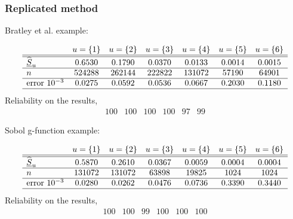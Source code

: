 \subsubsection{Replicated method}
Bratley et al. example:

\[
\begin{array}{lcccccc}
   & u=\{1\} & u=\{2\} & u=\{3\} & u=\{4\} & u=\{5\} & u=\{6\} \\ \hline \hline
 \widehat{\underline{S}}_u & 0.6530 & 0.1790 & 0.0370 & 0.0133 & 0.0014 & 0.0015 \\ \hline
 n & 524288 & 262144  &  222822 & 131072 & 57190 & 64901 \\ \hline
 \text{error } 10^{-3} & 0.0275 & 0.0592 & 0.0536 & 0.0667 &  0.2030 & 0.1180 \\ \hline
\end{array}
\]
Reliability on the results,
\[
\begin{array}{ cccccc }
     100  & 100  & 100  & 100  &  97  & 99
\end{array}
\]


Sobol g-function example:

\[
\begin{array}{lcccccc}
   & u=\{1\} & u=\{2\} & u=\{3\} & u=\{4\} & u=\{5\} & u=\{6\} \\ \hline \hline
 \widehat{\underline{S}}_u & 0.5870 & 0.2610 & 0.0367 &  0.0059 & 0.0004 & 0.0004 \\ \hline
 n & 131072 & 131072 & 63898 & 19825 & 1024 & 1024 \\ \hline
 \text{error } 10^{-3} & 0.0280 & 0.0262 & 0.0476 & 0.0736 & 0.3390 & 0.3440 \\ \hline
\end{array}
\]
Reliability on the results,
\[
\begin{array}{ cccccc }
     100  & 100  & 99  & 100  &  100  & 100
\end{array}
\]



